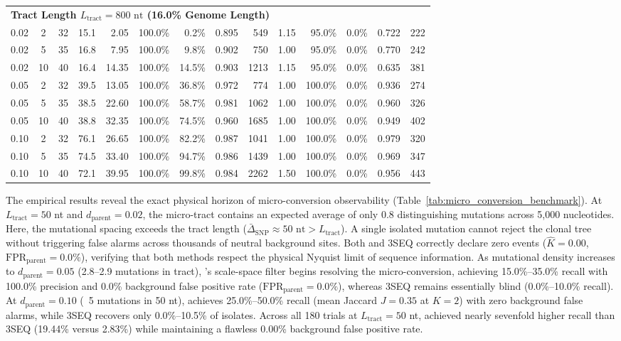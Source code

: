 \begin{table}[t!]
\begin{tabular*}{\textwidth}{@{\extracolsep{\fill}} ccc c rrrrr rrrrr @{}}
\midrule
\multicolumn{14}{l}{\textbf{Tract Length $L_{\text{tract}} = 800\text{ nt}$ (16.0\% Genome Length)}} \\
0.02 &  2 & 32 & 15.1 &  2.05 & 100.0\% &   0.2\% & 0.895 &   549 &  1.15 &  95.0\% &   0.0\% & 0.722 &   222 \\
0.02 &  5 & 35 & 16.8 &  7.95 & 100.0\% &   9.8\% & 0.902 &   750 &  1.00 &  95.0\% &   0.0\% & 0.770 &   242 \\
0.02 & 10 & 40 & 16.4 & 14.35 & 100.0\% &  14.5\% & 0.903 &  1213 &  1.15 &  95.0\% &   0.0\% & 0.635 &   381 \\
0.05 &  2 & 32 & 39.5 & 13.05 & 100.0\% &  36.8\% & 0.972 &   774 &  1.00 & 100.0\% &   0.0\% & 0.936 &   274 \\
0.05 &  5 & 35 & 38.5 & 22.60 & 100.0\% &  58.7\% & 0.981 &  1062 &  1.00 & 100.0\% &   0.0\% & 0.960 &   326 \\
0.05 & 10 & 40 & 38.8 & 32.35 & 100.0\% &  74.5\% & 0.960 &  1685 &  1.00 & 100.0\% &   0.0\% & 0.949 &   402 \\
0.10 &  2 & 32 & 76.1 & 26.65 & 100.0\% &  82.2\% & 0.987 &  1041 &  1.00 & 100.0\% &   0.0\% & 0.979 &   320 \\
0.10 &  5 & 35 & 74.5 & 33.40 & 100.0\% &  94.7\% & 0.986 &  1439 &  1.00 & 100.0\% &   0.0\% & 0.969 &   347 \\
0.10 & 10 & 40 & 72.1 & 39.95 & 100.0\% &  99.8\% & 0.984 &  2262 &  1.50 & 100.0\% &   0.0\% & 0.956 &   443 \\
\bottomrule
\end{tabular*}
\end{table}

The empirical results reveal the exact physical horizon of micro-conversion observability (Table~\ref{tab:micro_conversion_benchmark}).
At $L_{\text{tract}} = 50$ nt and $d_{\text{parent}} = 0.02$, the micro-tract contains an expected average of only 0.8 distinguishing mutations across 5,000 nucleotides.
Here, the mutational spacing exceeds the tract length ($\bar{\Delta}_{\text{SNP}} \approx 50\text{ nt} > L_{\text{tract}}$).
A single isolated mutation cannot reject the clonal tree without triggering false alarms across thousands of neutral background sites.
Both \RhizAeon and 3SEQ correctly declare zero events ($\hat{K} = 0.00$, $\text{FPR}_{\text{parent}} = 0.0\%$), verifying that both methods respect the physical Nyquist limit of sequence information.
As mutational density increases to $d_{\text{parent}} = 0.05$ (2.8--2.9 mutations in tract), \RhizAeon's scale-space filter begins resolving the micro-conversion, achieving 15.0\%--35.0\% recall with 100.0\% precision and 0.0\% background false positive rate ($\text{FPR}_{\text{parent}} = 0.0\%$), whereas 3SEQ remains essentially blind (0.0\%--10.0\% recall).
At $d_{\text{parent}} = 0.10$ (~5 mutations in 50 nt), \RhizAeon achieves 25.0\%--50.0\% recall (mean Jaccard $J = 0.35$ at $K=2$) with zero background false alarms, while 3SEQ recovers only 0.0\%--10.5\% of isolates.
Across all 180 trials at $L_{\text{tract}} = 50$ nt, \RhizAeon achieved nearly sevenfold higher recall than 3SEQ (19.44\% versus 2.83\%) while maintaining a flawless 0.00\% background false positive rate.

